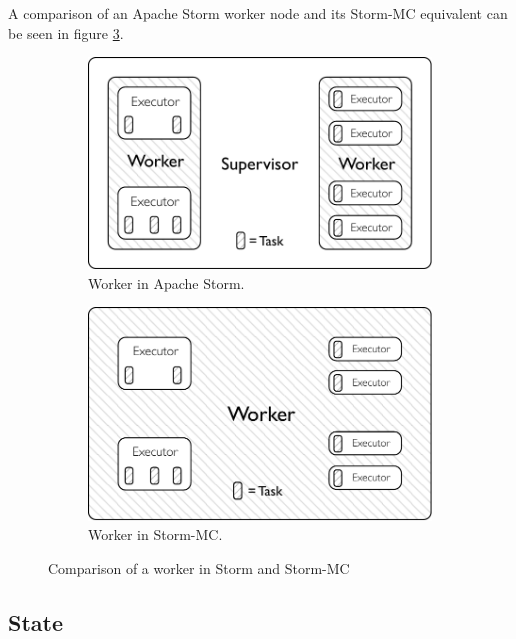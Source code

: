 A comparison of an Apache Storm worker node and its Storm-MC equivalent can be seen in figure \ref{fig:comparison}.

\begin{figure}[!htb]
\centering
\begin{subfigure}{.5\textwidth}
  \centering
  \includegraphics[width=0.95\linewidth]{pdf/distributed_worker.pdf}
  \caption{Worker in Apache Storm.}
  \label{fig:comparison1}
\end{subfigure}%
\begin{subfigure}{.5\textwidth}
  \centering
  \includegraphics[width=0.95\linewidth]{pdf/local_worker.pdf}
  \caption{Worker in Storm-MC.}
  \label{fig:comparison2}
\end{subfigure}
\caption{Comparison of a worker in Storm and Storm-MC}
\label{fig:comparison}
\end{figure}

\subsection{State}

